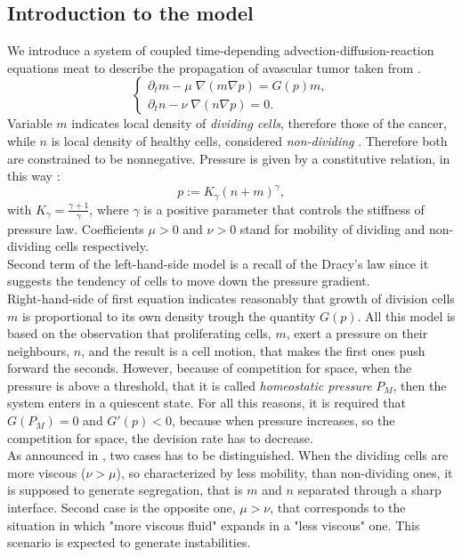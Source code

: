 \subsection {Introduction to the model}
We introduce a system of coupled time-depending advection-diffusion-reaction equations meat to describe the propagation of avascular tumor taken from \cite{tumor_growth}.
\begin{equation}
\label{tumor_system}
\begin{cases}
\partial_t m -\mu \; \nabla (m \nabla p) = G(p) m ,\\
\partial_t n -\nu \; \nabla (n \nabla p) = 0 .
\end{cases}
\end{equation}
Variable $ m $ indicates local density of \textit{dividing cells}, therefore those of the cancer, while $ n $ is local density of healthy cells, considered \textit{non-dividing }. Therefore both are constrained to be nonnegative. Pressure is given by a constitutive relation, in this way :
\begin{equation}
\label{pressure}
p := K_\gamma (n+m)^\gamma,
\end{equation}
with $ K_\gamma = \frac{\gamma + 1}{\gamma} $, where $ \gamma $ is a positive parameter that controls the stiffness of pressure law. Coefficients $ \mu > 0$ and $ \nu > 0 $ stand for mobility of dividing and non-dividing cells  respectively.\\
Second term of the left-hand-side model is a recall of the Dracy's law since it suggests the tendency of cells to move down the pressure gradient.\\
Right-hand-side of first equation indicates reasonably that growth of division cells $ m $ is proportional to its own density trough the quantity $ G(p) $. All this model is based on the observation that proliferating cells, $ m $, exert a pressure on their neighbours, $ n $,  and the result is a cell motion, that makes the first ones push forward the seconds. However, because of competition for space, when the pressure is above a threshold, that it is called \textit{homeostatic pressure} $ P_M $, then the system enters in a quiescent state. For all this reasons, it is required that $ G(P_M) = 0 $ and $ G'(p) < 0 $, because when pressure increases, so the competition for space, the devision rate has to decrease. \\
As announced in \cite{tumor_growth}, two cases has to be distinguished. When the dividing cells are more viscous ($ \nu > \mu $), so characterized by less mobility, than non-dividing ones, it is supposed to generate segregation, that is $ m $ and $ n $ separated through a sharp interface.
Second case is the opposite one, $ \mu > \nu $, that corresponds to the situation in which "more viscous fluid" expands in a "less viscous" one. This scenario is expected to generate instabilities.\\
